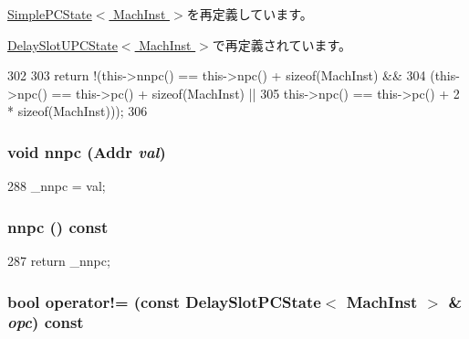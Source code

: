 \hyperlink{classGenericISA_1_1SimplePCState_ae3f0eb15a9382eefff6b00cf7999c2e3}{SimplePCState$<$ MachInst $>$}を再定義しています。

\hyperlink{classGenericISA_1_1DelaySlotUPCState_ae3f0eb15a9382eefff6b00cf7999c2e3}{DelaySlotUPCState$<$ MachInst $>$}で再定義されています。


\begin{DoxyCode}
302     {
303         return !(this->nnpc() == this->npc() + sizeof(MachInst) &&
304                  (this->npc() == this->pc() + sizeof(MachInst) ||
305                   this->npc() == this->pc() + 2 * sizeof(MachInst)));
306     }
\end{DoxyCode}
\hypertarget{classGenericISA_1_1DelaySlotPCState_aa271f07c4f1ca1fd242d543380f7e589}{
\subsubsection[{nnpc}]{\setlength{\rightskip}{0pt plus 5cm}void nnpc ({\bf Addr} {\em val})}}
\label{classGenericISA_1_1DelaySlotPCState_aa271f07c4f1ca1fd242d543380f7e589}



\begin{DoxyCode}
288 { _nnpc = val; }
\end{DoxyCode}
\hypertarget{classGenericISA_1_1DelaySlotPCState_af8c8ed8f237bb3c44902919fb4b6b1a4}{
\subsubsection[{nnpc}]{ nnpc () const}}
\label{classGenericISA_1_1DelaySlotPCState_af8c8ed8f237bb3c44902919fb4b6b1a4}



\begin{DoxyCode}
287 { return _nnpc; }
\end{DoxyCode}
\hypertarget{classGenericISA_1_1DelaySlotPCState_aaa54c276268b580f71a09be1cca39cc5}{
\subsubsection[{operator!=}]{\setlength{\rightskip}{0pt plus 5cm}bool operator!= (const {\bf DelaySlotPCState}$<$ MachInst $>$ \& {\em opc}) const}}
\label{classGenericISA_1_1DelaySlotPCState_aaa54c276268b580f71a09be1cca39cc5}


